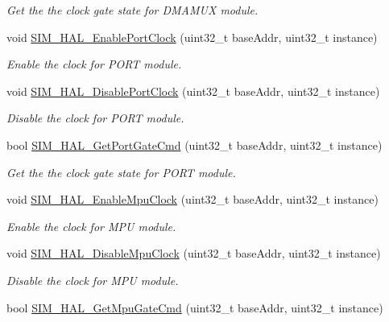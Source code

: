 \begin{DoxyCompactItemize}
\begin{DoxyCompactList}\small\item\em Get the the clock gate state for D\+M\+A\+M\+UX module. \end{DoxyCompactList}\item 
void \hyperlink{group__sim__hal_gade9c3b5001104022e9daa0fb5877cb0f}{S\+I\+M\+\_\+\+H\+A\+L\+\_\+\+Enable\+Port\+Clock} (uint32\+\_\+t base\+Addr, uint32\+\_\+t instance)
\begin{DoxyCompactList}\small\item\em Enable the clock for P\+O\+RT module. \end{DoxyCompactList}\item 
void \hyperlink{group__sim__hal_ga50897c47358005040b2d019441131ab1}{S\+I\+M\+\_\+\+H\+A\+L\+\_\+\+Disable\+Port\+Clock} (uint32\+\_\+t base\+Addr, uint32\+\_\+t instance)
\begin{DoxyCompactList}\small\item\em Disable the clock for P\+O\+RT module. \end{DoxyCompactList}\item 
bool \hyperlink{group__sim__hal_ga4b054f797b40e3206326a53d8a0f85d5}{S\+I\+M\+\_\+\+H\+A\+L\+\_\+\+Get\+Port\+Gate\+Cmd} (uint32\+\_\+t base\+Addr, uint32\+\_\+t instance)
\begin{DoxyCompactList}\small\item\em Get the the clock gate state for P\+O\+RT module. \end{DoxyCompactList}\item 
void \hyperlink{group__sim__hal_ga40261ac9c97b9898300ca28d65096366}{S\+I\+M\+\_\+\+H\+A\+L\+\_\+\+Enable\+Mpu\+Clock} (uint32\+\_\+t base\+Addr, uint32\+\_\+t instance)
\begin{DoxyCompactList}\small\item\em Enable the clock for M\+PU module. \end{DoxyCompactList}\item 
void \hyperlink{group__sim__hal_ga61a1d18f3be3b183c37070289bd6a265}{S\+I\+M\+\_\+\+H\+A\+L\+\_\+\+Disable\+Mpu\+Clock} (uint32\+\_\+t base\+Addr, uint32\+\_\+t instance)
\begin{DoxyCompactList}\small\item\em Disable the clock for M\+PU module. \end{DoxyCompactList}\item 
bool \hyperlink{group__sim__hal_gaf20c76ccbda2f2c4dabda65806b2294e}{S\+I\+M\+\_\+\+H\+A\+L\+\_\+\+Get\+Mpu\+Gate\+Cmd} (uint32\+\_\+t base\+Addr, uint32\+\_\+t instance)

\end{DoxyCompactItemize}
